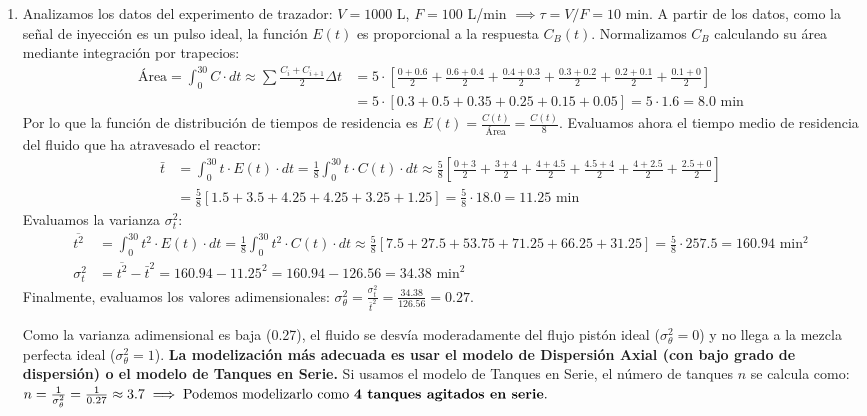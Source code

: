 \begin{enumerate}[label=\alph*)]
	\item Analizamos los datos del experimento de trazador:
	      $V = 1000$ L, $F = 100$ L/min $\implies \tau = V/F = 10$ min.
	      A partir de los datos, como la señal de inyección es un pulso ideal, la función $E(t)$ es proporcional a la respuesta $C_B(t)$. Normalizamos $C_B$ calculando su área mediante integración por trapecios:
	      \begin{align*}
		      \text{Área} = \int_0^{30} C \cdot dt \approx \sum \frac{C_i + C_{i+1}}{2} \Delta t & = 5 \cdot \left[ \frac{0+0.6}{2} + \frac{0.6+0.4}{2} + \frac{0.4+0.3}{2} + \frac{0.3+0.2}{2} + \frac{0.2+0.1}{2} + \frac{0.1+0}{2} \right] \\
		                                                                                         & = 5 \cdot [ 0.3 + 0.5 + 0.35 + 0.25 + 0.15 + 0.05 ] = 5 \cdot 1.6 = 8.0 \text{ min}
	      \end{align*}
	      Por lo que la función de distribución de tiempos de residencia es $E(t) = \frac{C(t)}{\text{Área}} = \frac{C(t)}{8}$.
	      Evaluamos ahora el tiempo medio de residencia del fluido que ha atravesado el reactor:
	      \begin{align*}
		      \bar{t} & = \int_0^{30} t \cdot E(t) \cdot dt = \frac{1}{8} \int_0^{30} t \cdot C(t) \cdot dt \approx \frac{5}{8} \left[ \frac{0+3}{2} + \frac{3+4}{2} + \frac{4+4.5}{2} + \frac{4.5+4}{2} + \frac{4+2.5}{2} + \frac{2.5+0}{2} \right] \\
		              & = \frac{5}{8} [ 1.5 + 3.5 + 4.25 + 4.25 + 3.25 + 1.25 ] = \frac{5}{8} \cdot 18.0 = 11.25 \text{ min}
	      \end{align*}
	      Evaluamos la varianza $\sigma_t^2$:
	      \begin{align*}
		      \overline{t^2} & = \int_0^{30} t^2 \cdot E(t) \cdot dt = \frac{1}{8} \int_0^{30} t^2 \cdot C(t) \cdot dt \approx \frac{5}{8} [ 7.5 + 27.5 + 53.75 + 71.25 + 66.25 + 31.25 ] = \frac{5}{8} \cdot 257.5 = 160.94 \text{ min}^2 \\
		      \sigma_t^2     & = \overline{t^2} - \bar{t}^2 = 160.94 - 11.25^2 = 160.94 - 126.56 = 34.38 \text{ min}^2
	      \end{align*}
	      Finalmente, evaluamos los valores adimensionales:
	      $\sigma_\theta^2 = \frac{\sigma_t^2}{\bar{t}^2} = \frac{34.38}{126.56} = 0.27$.

	      Como la varianza adimensional es baja (0.27), el fluido se desvía moderadamente del flujo pistón ideal ($\sigma_\theta^2 = 0$) y no llega a la mezcla perfecta ideal ($\sigma_\theta^2 = 1$).
	      \textbf{La modelización más adecuada es usar el modelo de Dispersión Axial (con bajo grado de dispersión) o el modelo de Tanques en Serie.}
	      Si usamos el modelo de Tanques en Serie, el número de tanques $n$ se calcula como:
	      $n = \frac{1}{\sigma_\theta^2} = \frac{1}{0.27} \approx 3.7 \implies \text{Podemos modelizarlo como \textbf{4 tanques agitados en serie}}.$


\end{enumerate}
